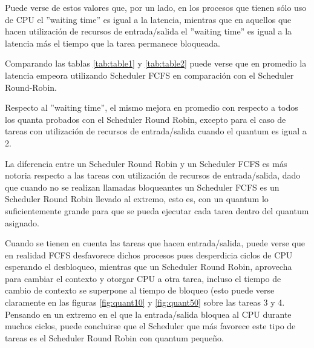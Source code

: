 Puede verse de estos valores que, por un lado, en los procesos que tienen sólo uso de CPU el ''waiting time'' es igual a la latencia, mientras que en aquellos que hacen utilización de recursos de entrada/salida el ''waiting time'' es igual a la latencia más el tiempo que la tarea permanece bloqueada.

Comparando las tablas \ref{tab:table1} y \ref{tab:table2} puede verse que en promedio la latencia empeora utilizando Scheduler FCFS en comparación con el Scheduler Round-Robin.

Respecto al ''waiting time'', el mismo mejora en promedio con respecto a todos los quanta probados con el Scheduler Round Robin, excepto para el caso de tareas con utilización de recursos de entrada/salida cuando el quantum es igual a 2.

La diferencia entre un Scheduler Round Robin y un Scheduler FCFS es más notoria respecto a las tareas con utilización de recursos de entrada/salida, dado que cuando no se realizan llamadas bloqueantes un Scheduler FCFS es un Scheduler Round Robin llevado al extremo, esto es, con un quantum lo suficientemente grande para que se pueda ejecutar cada tarea dentro del quantum asignado. 

Cuando se tienen en cuenta las tareas que hacen entrada/salida, puede verse que en realidad FCFS desfavorece dichos procesos pues desperdicia ciclos de CPU esperando el desbloqueo, mientras que un Scheduler Round Robin, aprovecha para cambiar el contexto y otorgar CPU a otra tarea, incluso el tiempo de cambio de contexto se superpone al tiempo de bloqueo (esto puede verse claramente en las figuras \ref{fig:quant10} y \ref{fig:quant50} sobre las tareas 3 y 4. 
Pensando en un extremo en el que la entrada/salida bloquea al CPU durante muchos ciclos, puede concluirse que el Scheduler que más favorece este tipo de tareas es el Scheduler Round Robin con quantum pequeño.